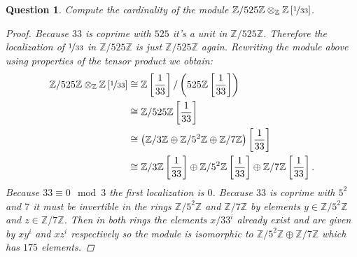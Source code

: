 \documentclass{article}
\newcommand{\Z}{\mathbb{Z}}
\newtheorem{question}{Question}
\theoremstyle{definition}
\begin{document}
\begin{question}
    Compute the cardinality of the module
    \(\Z/525\Z\otimes_{\Z}\Z\left[\nicefrac{1}{33}\right]\).

    \begin{proof}
        Because \(33\) is coprime with \(525\) it's a unit in \(\Z/525\Z\).
        Therefore the localization of \(\nicefrac{1}{33}\) in \(\Z/525\Z\) is
        just \(\Z/525\Z\) again. Rewriting the module above using properties of
        the tensor product we obtain:
        \begin{align*}
            \Z/525\Z\otimes_{\Z}\Z\left[\nicefrac{1}{33}\right] & \cong\Z\left[\frac{1}{33}\right]/\left(525\Z\left[\frac{1}{33}\right]\right)                                        \\
                                                                & \cong\Z/525\Z\left[\frac{1}{33}\right]                                                                              \\
                                                                & \cong\left(\Z/3\Z\oplus\Z/5^{2}\Z\oplus\Z/7\Z\right)\left[\frac{1}{33}\right]                                       \\
                                                                & \cong\Z/3\Z\left[\frac{1}{33}\right]\oplus\Z/5^{2}\Z\left[\frac{1}{33}\right]\oplus\Z/7\Z\left[\frac{1}{33}\right].
        \end{align*}
        Because \(33\equiv0\mod 3\) the first localization is \(0\). Because
        \(33\) is coprime with \(5^{2}\) and \(7\) it must be invertible in the
        rings \(\Z/5^{2}\Z\) and \(\Z/7\Z\) by elements \(y\in\Z/5^{2}\Z\) and
        \(z\in\Z/7\Z\). Then in both rings the elements \(x/33^{i}\) already
        exist and are given by \(xy^{i}\) and \(xz^{i}\) respectively so the
        module is isomorphic to \(\Z/5^{2}\Z\oplus\Z/7\Z\) which has
        \(175\) elements.
    \end{proof}
\end{question}
\end{document}
